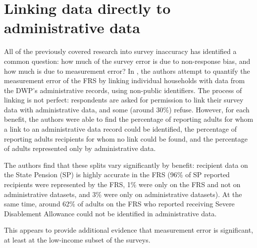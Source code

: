 \documentclass{article}
\begin{document}
\section{Linking data directly to administrative data}

All of the previously covered research into survey inaccuracy has identified a common question: how much of the survey error is due to non-response bias, and how much is due to measurement error? In \cite{dwp_110}, the authors attempt to quantify the measurement error of the FRS by linking individual households with data from the DWP's administrative records, using non-public identifiers. The process of linking is not perfect: respondents are asked for permission to link their survey data with administrative data, and some (around 30\%) refuse. However, for each benefit, the authors were able to find the percentage of reporting adults for whom a link to an administrative data record could be identified, the percentage of reporting adults recipients for whom no link could be found, and the percentage of adults represented only by administrative data. 

The authors find that these splits vary significantly by benefit: recipient data on the State Pension (SP) is highly accurate in the FRS (96\% of SP reported recipients were represented by the FRS, 1\% were only on the FRS and not on administrative datasets, and 3\% were only on administrative datasets). At the same time, around 62\% of adults on the FRS who reported receiving Severe Disablement Allowance could not be identified in administrative data.

This appears to provide additional evidence that measurement error is significant, at least at the low-income subset of the surveys.



    
\end{document}
